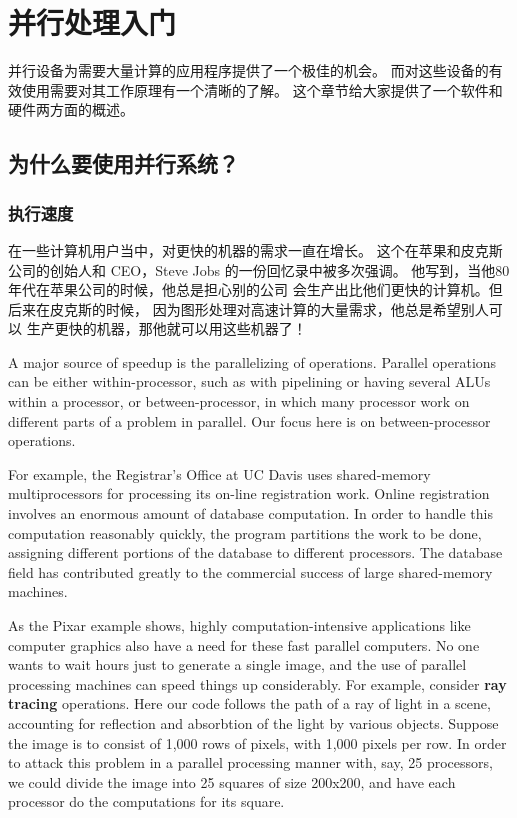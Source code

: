 \chapter{并行处理入门}
\label{chap:intro}

并行设备为需要大量计算的应用程序提供了一个极佳的机会。
而对这些设备的有效使用需要对其工作原理有一个清晰的了解。
这个章节给大家提供了一个软件和硬件两方面的概述。

\section{为什么要使用并行系统？}

\subsection{执行速度}

在一些计算机用户当中，对更快的机器的需求一直在增长。
这个在苹果和皮克斯公司的创始人和 CEO，Steve Jobs 的一份回忆录中被多次强调。
他写到，当他80年代在苹果公司的时候，他总是担心别的公司
会生产出比他们更快的计算机。但后来在皮克斯的时候，
因为图形处理对高速计算的大量需求，他总是希望别人可以
生产更快的机器，那他就可以用这些机器了！

A major source of speedup is the parallelizing of operations. Parallel
operations can be either within-processor, such as with pipelining or
having several ALUs within a processor, or between-processor, in which
many processor work on different parts of a problem in parallel. Our
focus here is on between-processor operations.

For example, the Registrar's Office at UC Davis uses shared-memory
multiprocessors for processing its on-line registration work.  Online
registration involves an enormous amount of database computation.  In
order to handle this computation reasonably quickly, the program
partitions the work to be done, assigning different portions of the
database to different processors.  The database field has contributed
greatly to the commercial success of large shared-memory machines.

As the Pixar example shows, highly computation-intensive applications
like computer graphics also have a need for these fast parallel
computers. No one wants to wait hours just to generate a single image,
and the use of parallel processing machines can speed things up
considerably. For example, consider \textbf{ray tracing} operations.
Here our code follows the path of a ray of light in a scene, accounting
for reflection and absorbtion of the light by various objects. Suppose
the image is to consist of 1,000 rows of pixels, with 1,000 pixels per
row.  In order to attack this problem in a parallel processing manner
with, say, 25 processors, we could divide the image into 25 squares of
size 200x200, and have each processor do the computations for its
square.

